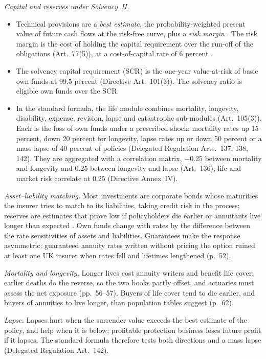 \begin{qfmethod}
\emph{Capital and reserves under Solvency~II.}
\begin{itemize}
\item Technical provisions are a \emph{best estimate}, the probability-weighted present value of future cash flows at the risk-free curve, plus a \emph{risk margin} \citep[Art.~77(1)--(2)]{eu-2009-138-solvency2}. The risk margin is the cost of holding the capital requirement over the run-off of the obligations (Art.~77(5)), at a cost-of-capital rate of 6 percent \citep[Arts.~37, 39]{eu-2015-35-solvency2-dr}.
\item The solvency capital requirement (SCR) is the one-year value-at-risk of basic own funds at 99.5 percent (Directive Art.~101(3)). The solvency ratio is eligible own funds over the SCR.
\item In the standard formula, the life module combines mortality, longevity, disability, expense, revision, lapse and catastrophe sub-modules (Art.~105(3)). Each is the loss of own funds under a prescribed shock: mortality rates up 15 percent, down 20 percent for longevity, lapse rates up or down 50 percent or a mass lapse of 40 percent of policies (Delegated Regulation Arts.~137, 138, 142). They are aggregated with a correlation matrix, $-0.25$ between mortality and longevity and $0.25$ between longevity and lapse (Art.~136); life and market risk correlate at $0.25$ (Directive Annex~IV).
\end{itemize}

\emph{Asset--liability matching.} Most investments are corporate bonds whose maturities the insurer tries to match to its liabilities, taking credit risk in the process; reserves are estimates that prove low if policyholders die earlier or annuitants live longer than expected \citep[p.~63]{risk-management-financial-institutions-2023}. Own funds change with rates by the difference between the rate sensitivities of assets and liabilities. Guarantees make the response asymmetric: guaranteed annuity rates written without pricing the option ruined at least one UK insurer when rates fell and lifetimes lengthened (p.~52).

\emph{Mortality and longevity.} Longer lives cost annuity writers and benefit life cover; earlier deaths do the reverse, so the two books partly offset, and actuaries must assess the net exposure (pp.~56--57). Buyers of life cover tend to die earlier, and buyers of annuities to live longer, than population tables suggest (p.~62).

\emph{Lapse.} Lapses hurt when the surrender value exceeds the best estimate of the policy, and help when it is below; profitable protection business loses future profit if it lapses. The standard formula therefore tests both directions and a mass lapse (Delegated Regulation Art.~142).


\end{qfmethod}
